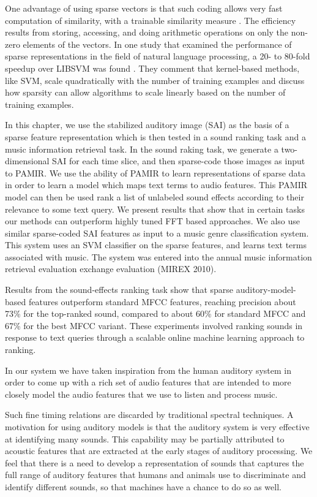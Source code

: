 \documentclass[12pt,oneside]{book}
\begin{document}
One advantage of using sparse vectors is that such coding allows very
fast computation of similarity, with a trainable similarity measure
\cite{chechik2010}. The efficiency results from storing, accessing,
and doing arithmetic operations on only the non-zero elements of the
vectors.  In one study that examined the performance of sparse
representations in the field of natural language processing, a 20- to
80-fold speedup over LIBSVM was found \cite{haffner2006}.  They
comment that kernel-based methods, like SVM, scale quadratically with
the number of training examples and discuss how sparsity can allow
algorithms to scale linearly based on the number of training examples.

In this chapter, we use the stabilized auditory image (SAI) as the
basis of a sparse feature representation which is then tested in a
sound ranking task and a music information retrieval task. In the
sound raking task, we generate a two-dimensional SAI for each time
slice, and then sparse-code those images as input to PAMIR.  We use
the ability of PAMIR to learn representations of sparse data in order
to learn a model which maps text terms to audio features.  This PAMIR
model can then be used rank a list of unlabeled sound effects
according to their relevance to some text query. We present results
that show that in certain tasks our methods can outperform highly
tuned FFT based approaches. We also use similar sparse-coded SAI
features as input to a music genre classification system. This system
uses an SVM classifier on the sparse features, and learns text terms
associated with music. The system was entered into the annual music
information retrieval evaluation exchange evaluation (MIREX 2010).

Results from the sound-effects ranking task show that sparse
auditory-model-based features outperform standard MFCC features,
reaching precision about 73\% for the top-ranked sound, compared to
about 60\% for standard MFCC and 67\% for the best MFCC variant.
These experiments involved ranking sounds in response to text queries
through a scalable online machine learning approach to ranking.

In our system we have taken inspiration from the human auditory system
in order to come up with a rich set of audio features that are
intended to more closely model the audio features that we use to
listen and process music.  

Such fine timing relations are discarded by traditional spectral
techniques.  A motivation for using auditory models is that the
auditory system is very effective at identifying many sounds.  This
capability may be partially attributed to acoustic features that are
extracted at the early stages of auditory processing.  We feel that
there is a need to develop a representation of sounds that captures
the full range of auditory features that humans and animals use to
discriminate and identify different sounds, so that machines have a
chance to do so as well.
\end{document}
